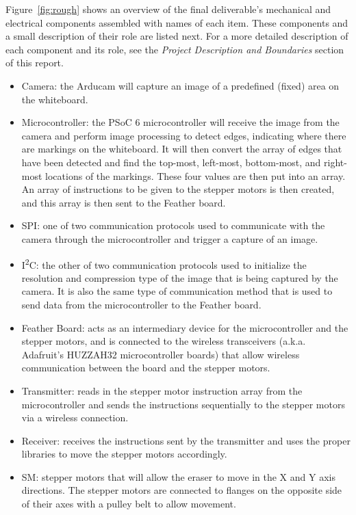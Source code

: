 Figure~\ref{fig:rough} shows an overview of the final deliverable's mechanical and electrical components assembled with names of each item. These components and a small description of their role are listed next. For a more detailed description of each component and its role, see the \textit{Project Description and Boundaries} section of this report.

\begin{itemize}
	\item Camera: the Arducam will capture an image of a predefined (fixed) area on the whiteboard.
	\item Microcontroller: the PSoC 6 microcontroller will receive the image from the camera and perform image processing to detect edges, indicating where there are markings on the whiteboard. It will then convert the array of edges that have been detected and find the top-most, left-most, bottom-most, and right-most locations of the markings. These four values are then put into an array. An array of instructions to be given to the stepper motors is then created, and this array is then sent to the Feather board.
	\item SPI: one of two communication protocols used to communicate with the camera through the microcontroller and trigger a capture of an image.
	\item I\textsuperscript{2}C: the other of two communication protocols used to initialize the resolution and compression type of the image that is being captured by the camera. It is also the same type of communication method that is used to send data from the microcontroller to the Feather board.
	\item Feather Board: acts as an intermediary device for the microcontroller and the stepper motors, and is connected to the wireless transceivers (a.k.a. Adafruit's HUZZAH32 microcontroller boards) that allow wireless communication between the board and the stepper motors.
	\item Transmitter: reads in the stepper motor instruction array from the microcontroller and sends the instructions sequentially to the stepper motors via a wireless connection.
	\item Receiver: receives the instructions sent by the transmitter and uses the proper libraries to move the stepper motors accordingly.
	\item SM: stepper motors that will allow the eraser to move in the X and Y axis directions. The stepper motors are connected to flanges on the opposite side of their axes with a pulley belt to allow movement.

\end{itemize}

